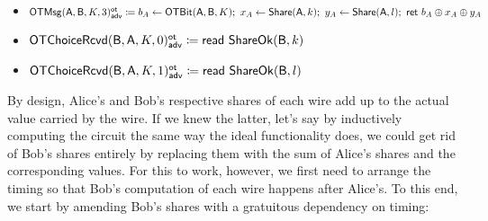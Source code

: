 \begin{itemize}
\begin{itemize}
\item {\color{blue} $\mathsf{OTMsg}(\mathsf{A},\mathsf{B},K,3)^{\mathsf{ot}}_{\mathsf{adv}} \coloneqq b_A \leftarrow \mathsf{OTBit}(\mathsf{A},\mathsf{B},K); \ x_A \leftarrow \mathsf{Share}(\mathsf{A},k); \ y_A \leftarrow \mathsf{Share}(\mathsf{A},l); \ \mathsf{ret} \ b_A \oplus x_A \oplus y_A$}\medskip
\item {\color{blue} $\mathsf{OTChoiceRcvd}(\mathsf{B},\mathsf{A},K,0)^{\mathsf{ot}}_{\mathsf{adv}} \coloneqq \mathsf{read} \ \mathsf{ShareOk}(\mathsf{B},k)$}
\item {\color{blue} $\mathsf{OTChoiceRcvd}(\mathsf{B},\mathsf{A},K,1)^{\mathsf{ot}}_{\mathsf{adv}} \coloneqq \mathsf{read} \ \mathsf{ShareOk}(\mathsf{B},l)$}
\end{itemize}
\end{itemize}

\noindent By design, Alice's and Bob's respective shares of each wire add up to the actual value carried by the wire. If we knew the latter, let's say by inductively computing the circuit the same way the ideal functionality does, we could get rid of Bob's shares entirely by replacing them with the sum of Alice's shares and the corresponding values. For this to work, however, we first need to arrange the timing so that Bob's computation of each wire happens after Alice's. To this end, we start by amending Bob's shares with a gratuitous dependency on timing:

